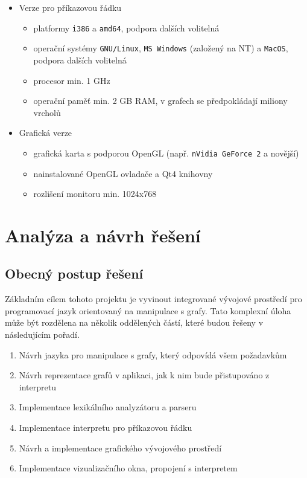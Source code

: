 \documentclass[11pt,twoside,a4paper]{book}
\begin{document}
\begin{itemize}
	\item Verze pro příkazovou řádku
		\begin{itemize}
		\item platformy \texttt{i386} a \texttt{amd64}, podpora dalších volitelná
		\item operační systémy \texttt{GNU/Linux}, \texttt{MS Windows} (založený na NT) a \texttt{MacOS}, podpora dalších volitelná
		\item procesor min. 1 GHz
		\item operační paměť min. 2 GB RAM, v grafech se předpokládají miliony vrcholů
		\end{itemize}

	\item Grafická verze
		\begin{itemize}
		\item grafická karta s podporou OpenGL (např. \texttt{nVidia GeForce 2} a novější)
		\item nainstalované OpenGL ovladače a Qt4 knihovny
		\item rozlišení monitoru min. 1024x768
		\end{itemize}
\end{itemize}



\chapter{Analýza a návrh řešení}


\section{Obecný postup řešení}

Základním cílem tohoto projektu je vyvinout integrované vývojové prostředí pro programovací jazyk orientovaný na manipulace s grafy. Tato komplexní úloha může být rozdělena na několik oddělených částí, které budou řešeny v následujícím pořadí.

\begin{enumerate}
\item Návrh jazyka pro manipulace s grafy, který odpovídá všem požadavkům
\item Návrh reprezentace grafů v aplikaci, jak k nim bude přistupováno z interpretu
\item Implementace lexikálního analyzátoru a parseru
\item Implementace interpretu pro příkazovou řádku
\item Návrh a implementace grafického vývojového prostředí
\item Implementace vizualizačního okna, propojení s interpretem
\end{enumerate}
\end{document}
